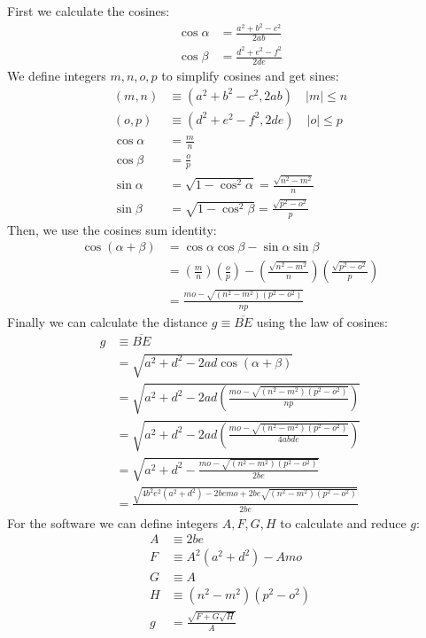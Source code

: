 \documentclass[11pt]{article}
\begin{document}
First we calculate the cosines:
\begin{align}
\cos\alpha &= \frac{a^2 + b^2 - c^2}{2ab}\nonumber\\
\cos\beta  &= \frac{d^2 + e^2 - f^2}{2de}\nonumber
\end{align}
We define integers $m,n,o,p$ to simplify cosines and get sines:
\begin{align}
(m, n) &\equiv (a^2 + b^2 - c^2, 2ab) \quad | m | \le n\\
(o, p) &\equiv (d^2 + e^2 - f^2, 2de) \quad | o | \le p\\
\cos\alpha &= \frac{m}n\\
\cos\beta  &= \frac{o}p\\
\sin\alpha &= \sqrt{1-\cos^2\alpha} = \frac{\sqrt{n^2 - m^2}}n\\
\sin\beta  &= \sqrt{1-\cos^2\beta} = \frac{\sqrt{p^2 - o^2}}p
\end{align}
Then, we use the cosines sum identity:
\begin{align}
\cos(\alpha+\beta) &= \cos\alpha\cos\beta - \sin\alpha\sin\beta \nonumber\\
 &= \left(\frac{m}n\right)\left(\frac{o}p\right)
  - \left(\frac{\sqrt{n^2 - m^2}}n\right)\left(\frac{\sqrt{p^2 - o^2}}p\right) \nonumber\\
 &= \frac{mo - \sqrt{(n^2 - m^2)(p^2 - o^2)}}{np}
\end{align}
Finally we can calculate the distance $g \equiv \overline{BE}$ using the law of cosines:
\begin{align}
g &\equiv \overline{BE}\nonumber\\
 &= \sqrt{a^2 + d^2 - 2ad\cos(\alpha+\beta)}\nonumber\\
 &= \sqrt{a^2 + d^2 - 2ad\left(\frac{mo - \sqrt{(n^2 - m^2)(p^2 - o^2)}}{np}\right)}\nonumber\\
 &= \sqrt{a^2 + d^2 - 2ad\left(\frac{mo - \sqrt{(n^2 - m^2)(p^2 - o^2)}}{4abde}\right)}\nonumber\\
 &= \sqrt{a^2 + d^2 - \frac{mo - \sqrt{(n^2 - m^2)(p^2 - o^2)}}{2be}}\nonumber\\
 &= \frac{\sqrt{4b^2e^2(a^2 + d^2) - 2bemo + 2be\sqrt{(n^2 - m^2)(p^2 - o^2)}}}{2be}
\end{align}
For the software we can define integers $A,F,G,H$ to calculate and reduce $g$:
\begin{align}
A &\equiv 2be\\
F &\equiv A^2(a^2+d^2) - Amo\\
G &\equiv A\\
H &\equiv (n^2-m^2)(p^2-o^2)\\
g &= \frac{\sqrt{F+G\sqrt{H}}}A
\end{align}
\end{document}
